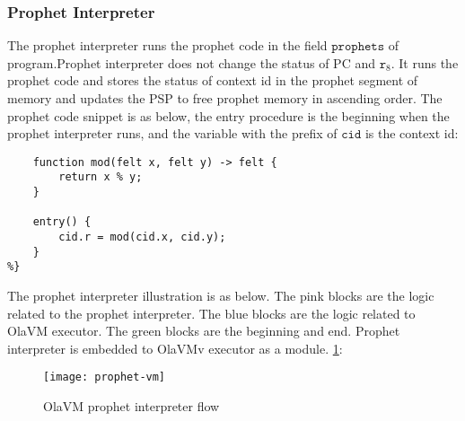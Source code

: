 \subsubsection{Prophet Interpreter}\label{subsec: prophet-interpreter}
The prophet interpreter runs the prophet code in the field $\texttt{prophets}$ of program.Prophet interpreter does not change the status of PC and $\texttt{r}_{8}$.
It runs the prophet code and stores the status of context id in the prophet segment of memory and updates the PSP to free prophet memory in ascending order.
The prophet code snippet is as below, the entry procedure is the beginning when the prophet interpreter runs, and the variable with the prefix of $\texttt{cid}$ is the context id:
\begin{lstlisting}[label={lst:prophet-demo}]
%{
    function mod(felt x, felt y) -> felt {
        return x % y;
    }

    entry() {
        cid.r = mod(cid.x, cid.y);
    }
%}
\end{lstlisting}

The prophet interpreter illustration is as below.
The pink blocks are the logic related to the prophet interpreter.
The blue blocks are the logic related to OlaVM executor.
The green blocks are the beginning and end.
Prophet interpreter is embedded to OlaVMv executor as a module. \ref{fig: prophet-interpreter-logic}:
\begin{figure}[!htp]
    \centering
    \texttt{[image: prophet-vm]}
    \caption{OlaVM prophet interpreter flow}
    \label{fig: prophet-interpreter-logic}
\end{figure}
